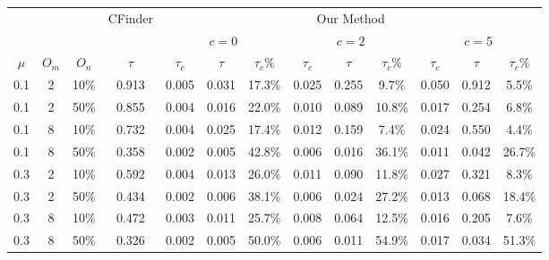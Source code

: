 \begin{table}[!h]
\begin{tabular}{ c c c || c | c c c | c c c | c c c }
\toprule\toprule
 	&  		& 		&	CFinder	&			\multicolumn{9}{c}{Our Method}			\\
 	&  		& 		&			&			\multicolumn{3}{c}{$c=0$}				&		\multicolumn{3}{c}{$c=2$}	&	\multicolumn{3}{c}{$c=5$}				\\
\hline
$\mu$&$O_m$	&$O_n$	&	$\tau$	&	$\tau_c$	&	$\tau$	&$\tau_c\%$	&	$\tau_c$	&	$\tau$	&$\tau_c\%$	&	$\tau_c$	&	$\tau$	&$\tau_c\%$	\\
\hline\hline
0.1	&	2	&	10\%	&	0.913	&	0.005	&	0.031	&	17.3\%	&	0.025	&	0.255	&	9.7\%	&	0.050	&	0.912	&	5.5\%	\\
0.1	&	2	&	50\%	&	0.855	&	0.004	&	0.016	&	22.0\%	&	0.010	&	0.089	&	10.8\%	&	0.017	&	0.254	&	6.8\%	\\
0.1	&	8	&	10\%	&	0.732	&	0.004	&	0.025	&	17.4\%	&	0.012	&	0.159	&	7.4\%	&	0.024	&	0.550	&	4.4\%	\\
0.1	&	8	&	50\%	&	0.358	&	0.002	&	0.005	&	42.8\%	&	0.006	&	0.016	&	36.1\%	&	0.011	&	0.042	&	26.7\%	\\
0.3	&	2	&	10\%	&	0.592	&	0.004	&	0.013	&	26.0\%	&	0.011	&	0.090	&	11.8\%	&	0.027	&	0.321	&	8.3\%	\\
0.3	&	2	&	50\%	&	0.434	&	0.002	&	0.006	&	38.1\%	&	0.006	&	0.024	&	27.2\%	&	0.013	&	0.068	&	18.4\%	\\
0.3	&	8	&	10\%	&	0.472	&	0.003	&	0.011	&	25.7\%	&	0.008	&	0.064	&	12.5\%	&	0.016	&	0.205	&	7.6\%	\\
0.3	&	8	&	50\%	&	0.326	&	0.002	&	0.005	&	50.0\%	&	0.006	&	0.011	&	54.9\%	&	0.017	&	0.034	&	51.3\%	\\\bottomrule\bottomrule
\end{tabular}

\end{table}
